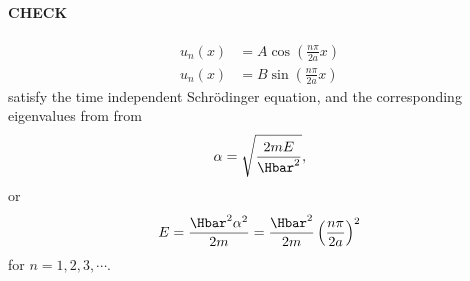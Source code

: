 {\paragraph{CHECK}
%
\begin{equation}\label{eqn:lecture9boundStates:220}
\begin{aligned}
u_n(x) &= A \cos \left( \frac{n \pi}{2 a} x \right) \\
u_n(x) &= B \sin \left( \frac{n \pi}{2 a} x \right)
\end{aligned}
\end{equation}
%
satisfy the time independent Schr\"{o}dinger equation, and the corresponding eigenvalues from from
%
\begin{equation}\label{eqn:lecture9boundStates:240}
\begin{aligned}
\alpha = \sqrt{\frac{2 m E}{\Hbar^2}},
\end{aligned}
\end{equation}
%
or
%
\begin{equation}\label{eqn:lecture9boundStates:260}
\begin{aligned}
E = \frac{\Hbar^2 \alpha^2}{2m} = \frac{\Hbar^2}{2m} \left( \frac{n \pi}{2a} \right)^2
\end{aligned}
\end{equation}
%
for \(n = 1, 2, 3, \cdots\).
%
}
